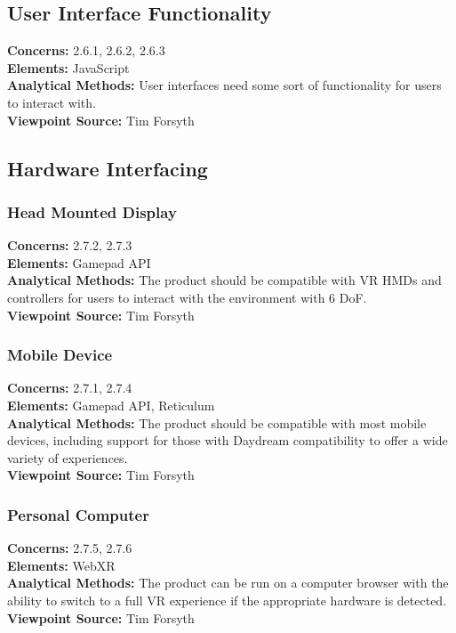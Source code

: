 \documentclass[onecolumn, draftclsnofoot,10pt, compsoc]{IEEEtran}
\begin{document}
\subsection{User Interface Functionality}
\textbf{Concerns:} 2.6.1, 2.6.2, 2.6.3\\
\textbf{Elements:} JavaScript\\
\textbf{Analytical Methods:} User interfaces need some sort of functionality for users to interact with.\\
\textbf{Viewpoint Source:} Tim Forsyth

\subsection{Hardware Interfacing}
\subsubsection{Head Mounted Display}
\textbf{Concerns:} 2.7.2, 2.7.3\\
\textbf{Elements:} Gamepad API\\
\textbf{Analytical Methods:} The product should be compatible with VR HMDs and controllers for users to interact with the environment with 6 DoF.\\
\textbf{Viewpoint Source:} Tim Forsyth

\subsubsection{Mobile Device}
\textbf{Concerns:} 2.7.1, 2.7.4\\
\textbf{Elements:} Gamepad API, Reticulum\\
\textbf{Analytical Methods:} The product should be compatible with most mobile devices, including support for those with Daydream compatibility to offer a wide variety of experiences.\\
\textbf{Viewpoint Source:} Tim Forsyth

\subsubsection{Personal Computer}
\textbf{Concerns:} 2.7.5, 2.7.6\\
\textbf{Elements:} WebXR\\
\textbf{Analytical Methods:} The product can be run on a computer browser with the ability to switch to a full VR experience if the appropriate hardware is detected.\\
\textbf{Viewpoint Source:} Tim Forsyth
\end{document}
